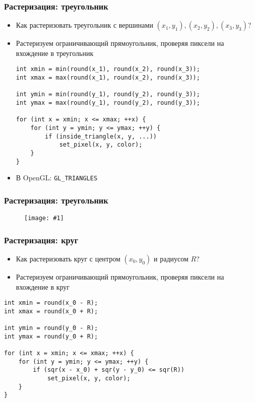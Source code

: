 \documentclass{beamer}
\newcommand{\slideimage}[1]{
  \begin{figure}
    \begin{adjustbox}{width=\textwidth, totalheight=\textheight-2\baselineskip-2\baselineskip,keepaspectratio}
      \texttt{[image: \#1]}
    \end{adjustbox}
  \end{figure}
}
\begin{document}
\begin{frame}[fragile]
\frametitle{Растеризация: треугольник}
\begin{itemize}
\item Как растеризовать треугольник с вершинами \begin{math}(x_1, y_1), (x_2, y_2), (x_3, y_3)\end{math}?
\pause
\item Растеризуем ограничивающий прямоугольник, проверяя пиксели на вхождение в треугольник
\pause
\begin{verbatim}
int xmin = min(round(x_1), round(x_2), round(x_3));
int xmax = max(round(x_1), round(x_2), round(x_3));

int ymin = min(round(y_1), round(y_2), round(y_3));
int ymax = max(round(y_1), round(y_2), round(y_3));

for (int x = xmin; x <= xmax; ++x) {
    for (int y = ymin; y <= ymax; ++y) {
        if (inside_triangle(x, y, ...))
            set_pixel(x, y, color);
    }
}
\end{verbatim}
\pause
\item В OpenGL: \verb|GL_TRIANGLES|
\end{itemize}
\end{frame}

\begin{frame}
\frametitle{Растеризация: треугольник}
\slideimage{raster-triangle.png}
\end{frame}

\begin{frame}[fragile]
\frametitle{Растеризация: круг}
\begin{itemize}
\item Как растеризовать круг с центром \begin{math}(x_0, y_0)\end{math} и радиусом \begin{math}R\end{math}?
\pause
\item Растеризуем ограничивающий прямоугольник, проверяя пиксели на вхождение в круг
\end{itemize}
\pause
\begin{verbatim}
int xmin = round(x_0 - R);
int xmax = round(x_0 + R);

int ymin = round(y_0 - R);
int ymax = round(y_0 + R);

for (int x = xmin; x <= xmax; ++x) {
    for (int y = ymin; y <= ymax; ++y) {
        if (sqr(x - x_0) + sqr(y - y_0) <= sqr(R))
            set_pixel(x, y, color);
    }
}
\end{verbatim}
\end{frame}
\end{document}
